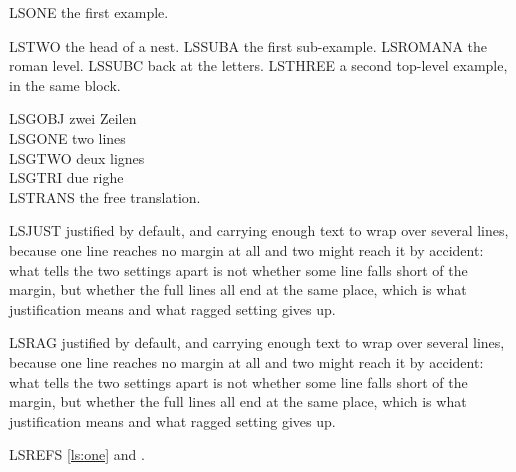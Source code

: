 

\ea\label{ls:one} LSONE the first example.
\z

\ea LSTWO the head of a nest.
  \ea LSSUBA the first sub-example.
    \ea LSROMANA the roman level.
    \z
  \ex LSSUBC back at the letters.
  \z
\ex LSTHREE a second top-level example, in the same block.
\z

\ea \gllll LSGOBJ zwei Zeilen\\
           LSGONE two lines\\
           LSGTWO deux lignes\\
           LSGTRI due righe\\
\glt LSTRANS the free translation.
\z

\ea LSJUST justified by default, and carrying enough text to wrap over
several lines, because one line reaches no margin at all and two might
reach it by accident: what tells the two settings apart is not whether
some line falls short of the margin, but whether the full lines all end
at the same place, which is what justification means and what ragged
setting gives up.
\z

{\ExRaggedRight
\ea LSRAG justified by default, and carrying enough text to wrap over
several lines, because one line reaches no margin at all and two might
reach it by accident: what tells the two settings apart is not whether
some line falls short of the margin, but whether the full lines all end
at the same place, which is what justification means and what ragged
setting gives up.
\z
}

LSREFS \ref{ls:one} and \Last.

